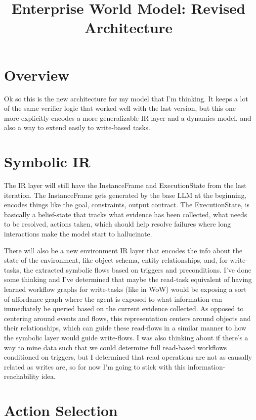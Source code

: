 \documentclass[11pt]{article}
\title{Enterprise World Model: Revised Architecture}
\author{}
\date{}
\begin{document}
\maketitle

\section*{Overview}

Ok so this is the new architecture for my model that I’m thinking. It keeps a lot of the same verifier logic that worked well with the last version, but this one more explicitly encodes a more generalizable IR layer and a dynamics model, and also a way to extend easily to write-based tasks.

\section*{Symbolic IR}

The IR layer will still have the InstanceFrame and ExecutionState from the last iteration. The InstanceFrame gets generated by the base LLM at the beginning, encodes things like the goal, constraints, output contract. The ExecutionState, is basically a belief-state that tracks what evidence has been collected, what needs to be resolved, actions taken, which should help resolve failures where long interactions make the model start to hallucinate.

There will also be a new environment IR layer that encodes the info about the state of the environment, like object schema, entity relationships, and, for write-tasks, the extracted symbolic flows based on triggers and preconditions. I’ve done some thinking and I’ve determined that maybe the read-task equivalent of having learned workflow graphs for write-tasks (like in WoW) would be exposing a sort of affordance graph where the agent is exposed to what information can immediately be queried based on the current evidence collected. As opposed to centering around events and flows, this representation centers around objects and their relationships, which can guide these read-flows in a similar manner to how the symbolic layer would guide write-flows. I was also thinking about if there’s a way to mine data such that we could determine full read-based workflows conditioned on triggers, but I determined that read operations are not as causally related as writes are, so for now I’m going to stick with this information-reachability idea.

\section*{Action Selection}
\end{document}
